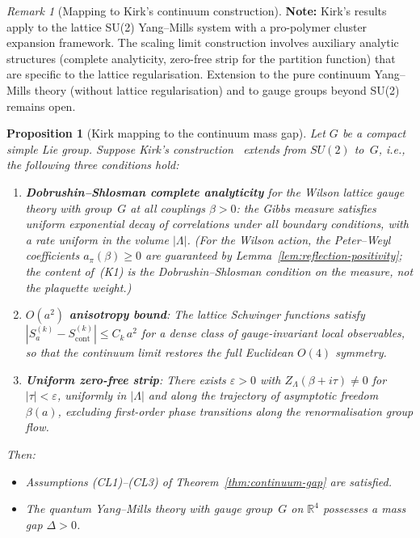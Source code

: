 \documentclass[12pt,a4paper]{article}
\theoremstyle{definition}
\theoremstyle{plain}
\newtheorem{proposition}[definition]{Proposition}
\theoremstyle{remark}
\newtheorem{remark}[definition]{Remark}
\begin{document}
\begin{remark}[Mapping to Kirk's continuum construction]
\textbf{Note:} Kirk's results~\cite{Kirk2026,Kirk2026b} apply to the lattice SU(2) Yang--Mills system with a pro-polymer cluster expansion framework. The scaling limit construction involves auxiliary analytic structures (complete analyticity, zero-free strip for the partition function) that are specific to the lattice regularisation. Extension to the pure continuum Yang--Mills theory (without lattice regularisation) and to gauge groups beyond SU(2) remains open.
\end{remark}

\begin{proposition}[Kirk mapping to the continuum mass gap]
\label{prop:kirk-mapping}
Let $G$ be a compact simple Lie group. Suppose Kirk's
construction~\cite{Kirk2026,Kirk2026b} extends from $SU(2)$ to~$G$,
i.e., the following three conditions hold:
\begin{enumerate}[label=\textup{(K\arabic*)}]
    \item \textbf{Dobrushin--Shlosman complete analyticity} for the
        Wilson lattice gauge theory with group~$G$ at all couplings $\beta > 0$:
        the Gibbs measure satisfies uniform exponential decay of
        correlations under all boundary conditions, with a rate uniform
        in the volume $|\Lambda|$. (For the Wilson action, the Peter--Weyl coefficients
        $a_\pi(\beta) \geq 0$ are guaranteed by Lemma~\ref{lem:reflection-positivity};
        the content of~\textup{(K1)} is the Dobrushin--Shlosman condition on the
        \emph{measure}, not the plaquette weight.)
    \item \textbf{$O(a^2)$ anisotropy bound}: The lattice Schwinger functions
        satisfy $|S^{(k)}_a - S^{(k)}_{\mathrm{cont}}| \leq C_k\,a^2$ for
        a dense class of gauge-invariant local observables, so that
        the continuum limit restores the full Euclidean $O(4)$ symmetry.
    \item \textbf{Uniform zero-free strip}: There exists $\varepsilon > 0$
        with $Z_\Lambda(\beta + i\tau) \neq 0$ for $|\tau| < \varepsilon$,
        uniformly in $|\Lambda|$ and along the trajectory of asymptotic
        freedom $\beta(a)$, excluding first-order phase transitions along the
        renormalisation group flow.
\end{enumerate}
Then:
\begin{itemize}
    \item[\textup{(a)}] Assumptions \textup{(CL1)--(CL3)} of
        Theorem~\ref{thm:continuum-gap} are satisfied.
    \item[\textup{(b)}] The quantum Yang--Mills theory with gauge group~$G$
        on $\mathbb{R}^4$ possesses a mass gap $\Delta > 0$.
\end{itemize}
\end{proposition}
\end{document}
